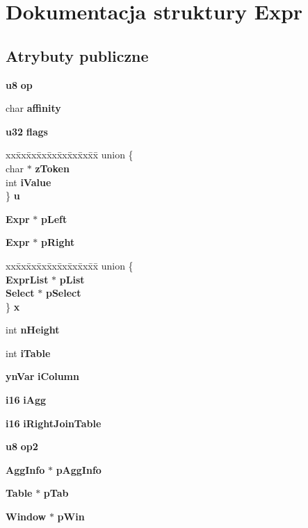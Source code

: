 \section{Dokumentacja struktury Expr}
\label{struct_expr}
\subsection*{Atrybuty publiczne}
\begin{DoxyCompactItemize}
\item 
\textbf{ u8} \textbf{ op}
\item 
char \textbf{ affinity}
\item 
\textbf{ u32} \textbf{ flags}
\item 
\begin{tabbing}
xx\=xx\=xx\=xx\=xx\=xx\=xx\=xx\=xx\=\kill
union \{\\
\>char $\ast$ \textbf{ zToken}\\
\>int \textbf{ iValue}\\
\} \textbf{ u}\\

\end{tabbing}\item 
\textbf{ Expr} $\ast$ \textbf{ p\+Left}
\item 
\textbf{ Expr} $\ast$ \textbf{ p\+Right}
\item 
\begin{tabbing}
xx\=xx\=xx\=xx\=xx\=xx\=xx\=xx\=xx\=\kill
union \{\\
\>\textbf{ ExprList} $\ast$ \textbf{ pList}\\
\>\textbf{ Select} $\ast$ \textbf{ pSelect}\\
\} \textbf{ x}\\

\end{tabbing}\item 
int \textbf{ n\+Height}
\item 
int \textbf{ i\+Table}
\item 
\textbf{ yn\+Var} \textbf{ i\+Column}
\item 
\textbf{ i16} \textbf{ i\+Agg}
\item 
\textbf{ i16} \textbf{ i\+Right\+Join\+Table}
\item 
\textbf{ u8} \textbf{ op2}
\item 
\textbf{ Agg\+Info} $\ast$ \textbf{ p\+Agg\+Info}
\item 
\textbf{ Table} $\ast$ \textbf{ p\+Tab}
\item 
\textbf{ Window} $\ast$ \textbf{ p\+Win}
\end{DoxyCompactItemize}


